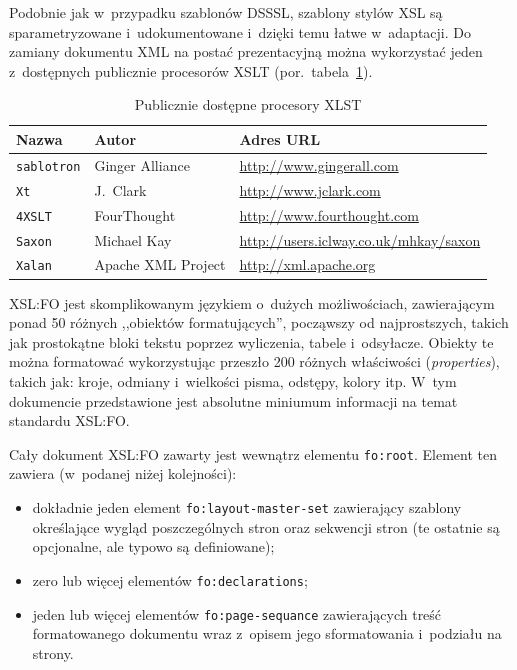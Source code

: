 \documentclass[document]{xmgr}
\begin{document}
Podobnie jak w~przypadku szablonów DSSSL, szablony stylów XSL są
sparametryzowane i~udokumentowane i~dzięki temu łatwe w~adaptacji. Do
zamiany dokumentu XML na postać prezentacyjną można wykorzystać jeden
z~dostępnych publicznie procesorów XSLT
(por.~tabela~\ref{zest:proces:xslt}).

\begin{table}[!htb]
\begin{tabular}{|l|l|l|} \hline
Nazwa & Autor      & Adres URL \\ \hline
\texttt{sablotron} & Ginger Alliance & \url{http://www.gingerall.com} \\ \hline
\texttt{Xt}        & J.~Clark & \url{http://www.jclark.com} \\ \hline
\texttt{4XSLT}     & FourThought & \url{http://www.fourthought.com} \\ \hline
\texttt{Saxon}     & Michael Kay &  \url{http://users.iclway.co.uk/mhkay/saxon} \\ \hline
\texttt{Xalan}     & Apache XML Project & \url{http://xml.apache.org} \\ \hline
\end{tabular}
\caption{Publicznie dostępne procesory XLST\label{zest:proces:xslt}}
\end{table}

XSL:FO jest skomplikowanym językiem o~dużych możliwościach,
zawierającym ponad 50 różnych ,,obiektów formatujących'', począwszy od
najprostszych, takich jak prostokątne bloki tekstu poprzez wyliczenia,
tabele i~odsyłacze. Obiekty te można formatować wykorzystując przeszło
200 różnych właściwości (\emph{properties\/}), takich jak: kroje,
odmiany i~wielkości pisma, odstępy, kolory itp.
W~tym dokumencie przedstawione jest absolutne miniumum informacji
na temat standardu XSL:FO.

Cały dokument XSL:FO zawarty jest wewnątrz elementu \texttt{fo:root}.
Element ten zawiera (w~podanej niżej kolejności):

\begin{itemize}
\item dokładnie jeden element \texttt{fo:layout-master-set} zawierający
  szablony określające wygląd poszczególnych stron oraz sekwencji
  stron (te ostatnie są opcjonalne, ale typowo są definiowane);
\item zero lub więcej elementów \texttt{fo:declarations};
\item jeden lub więcej elementów \texttt{fo:page-sequance}
 zawierających treść formatowanego dokumentu wraz z~opisem
 jego sformatowania i~podziału na strony.
\end{itemize}
\end{document}
